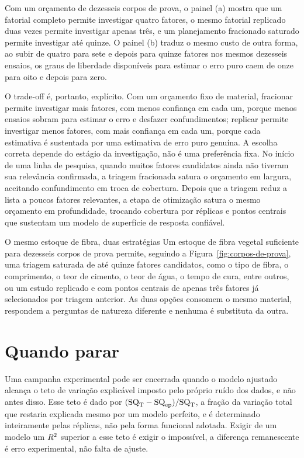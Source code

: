 \documentclass{doeapostila}
\begin{document}
Com um orçamento de dezesseis corpos de prova, o painel (a) mostra que um
fatorial completo permite investigar quatro fatores, o mesmo fatorial
replicado duas vezes permite investigar apenas três, e um planejamento
fracionado saturado permite investigar até quinze. O painel (b) traduz o
mesmo custo de outra forma, ao subir de quatro para sete e depois para quinze
fatores nos mesmos dezesseis ensaios, os graus de liberdade disponíveis para
estimar o erro puro caem de onze para oito e depois para zero.

O trade-off é, portanto, explícito. Com um orçamento fixo de material,
fracionar permite investigar mais fatores, com menos confiança em cada um,
porque menos ensaios sobram para estimar o erro e desfazer confundimentos;
replicar permite investigar menos fatores, com mais confiança em cada um,
porque cada estimativa é sustentada por uma estimativa de erro puro genuína.
A escolha correta depende do estágio da investigação, não é uma preferência
fixa. No início de uma linha de pesquisa, quando muitos fatores candidatos
ainda não tiveram sua relevância confirmada, a triagem fracionada satura o
orçamento em largura, aceitando confundimento em troca de cobertura. Depois
que a triagem reduz a lista a poucos fatores relevantes, a etapa de
otimização satura o mesmo orçamento em profundidade, trocando cobertura por
réplicas e pontos centrais que sustentam um modelo de superfície de resposta
confiável.

\begin{aplicacao}{O mesmo estoque de fibra, duas estratégias}
  Um estoque de fibra vegetal suficiente para dezesseis corpos de prova
  permite, seguindo a Figura~\ref{fig:corpos-de-prova}, uma triagem saturada
  de até quinze fatores candidatos, como o tipo de fibra, o comprimento, o
  teor de cimento, o teor de água, o tempo de cura, entre outros, ou um
  estudo replicado e com pontos centrais de apenas três fatores já
  selecionados por triagem anterior. As duas opções consomem o mesmo
  material, respondem a perguntas de natureza diferente e nenhuma é
  substituta da outra.
\end{aplicacao}

\section{Quando parar}
\label{sec:quando-parar}

Uma campanha experimental pode ser encerrada quando o modelo ajustado
alcança o teto de variação explicável imposto pelo próprio ruído dos dados,
e não antes disso. Esse teto é dado por
$(\mathrm{SQ}_{\mathrm{T}} - \mathrm{SQ}_{\mathrm{ep}})/\mathrm{SQ}_{\mathrm{T}}$, a fração da variação total que restaria explicada
mesmo por um modelo perfeito, e é determinado inteiramente pelas réplicas,
não pela forma funcional adotada. Exigir de um modelo um $R^{2}$ superior a
esse teto é exigir o impossível, a diferença remanescente é erro
experimental, não falta de ajuste.
\end{document}

